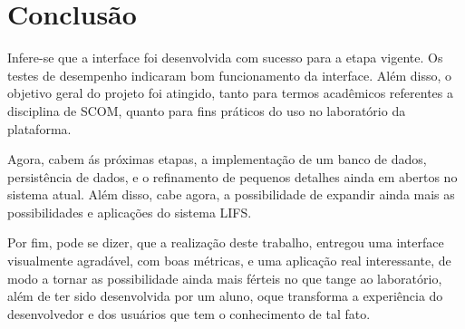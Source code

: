 \vspace{5mm}
\section{Conclusão}


Infere-se que a interface foi desenvolvida com sucesso para a etapa vigente. Os testes de desempenho indicaram bom funcionamento da interface. Além disso, o objetivo geral do projeto foi atingido, tanto para termos acadêmicos referentes a disciplina de SCOM, quanto para fins práticos do uso no laboratório da plataforma.

Agora, cabem ás próximas etapas, a implementação de um banco de dados, persistência de dados, e o refinamento de pequenos detalhes ainda em abertos no sistema atual. Além disso, cabe agora, a possibilidade de expandir ainda mais as possibilidades e aplicações do sistema LIFS. 

Por fim, pode se dizer, que a realização deste trabalho, entregou uma interface visualmente agradável, com boas métricas, e uma aplicação real interessante, de modo a tornar as possibilidade ainda mais férteis no que tange ao laboratório, além de ter sido desenvolvida por um aluno, oque transforma a experiência do desenvolvedor e dos usuários que tem o conhecimento de tal fato.